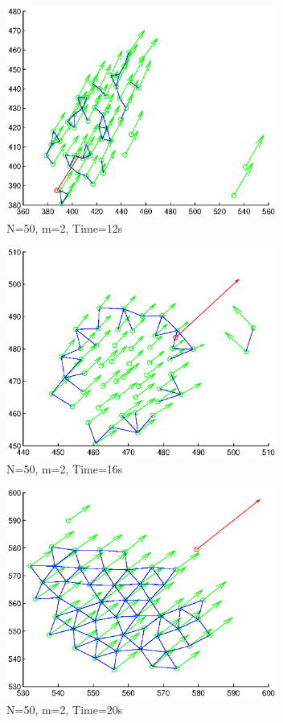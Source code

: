 \documentclass[10pt, conference, compsocconf]{IEEEtran}
\begin{document}
\begin{figure}[!p]
  \begin{center}
    \includegraphics[width=3.5in]{n50m2t12}
  \end{center}

  \caption{\small N=50, m=2, Time=12s}
  \label{fig:n50m2t12}
\end{figure}

\begin{figure}[!p]
  \begin{center}
    \includegraphics[width=3.5in]{n50m2t16}
  \end{center}

  \caption{\small N=50, m=2, Time=16s}
  \label{fig:n50m2t16}
\end{figure}

\begin{figure}[!p]
  \begin{center}
    \includegraphics[width=3.5in]{n50m2t20}
  \end{center}

  \caption{\small N=50, m=2, Time=20s}
  \label{fig:n50m2t20}
\end{figure}
\end{document}
